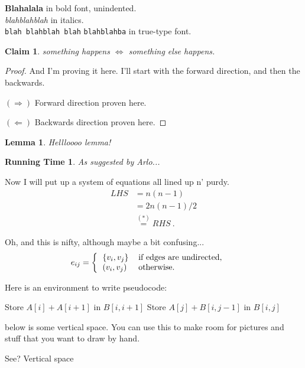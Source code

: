 \documentclass[11pt]{article}
\newtheorem{lemma}{Lemma}
\newtheorem*{claim}{Claim}
\newtheorem*{rt}{Running Time}
\begin{document}
\noindent \textbf{Blahalala} in bold font, unindented.\\
 
\noindent \emph{blahblahblah} in italics. \\

\noindent \verb+blah blahblah blah+ \texttt{blahblahba} in true-type font.\\ 

\begin{claim}
something happens $\iff$ something else happens.
\end{claim}

\begin{proof}And I'm proving it here. I'll start with the forward direction, and then the backwards.\medskip

\noindent $(\Rightarrow)$ Forward direction proven here.\medskip

\noindent $(\Leftarrow)$ Backwards direction proven here.\end{proof}

\begin{lemma}
Hellloooo lemma!
\end{lemma}

\begin{rt}
As suggested by Arlo...
\end{rt}

\newpage
\vspace*{2pt}

Now I will put up a system of equations all lined up n' purdy.
\begin{align*}
LHS &=  n(n-1) \\
&=  2n(n-1)/2 \\
& \stackrel{(*)}{=}  RHS~.
\end{align*}

Oh, and this is nifty, although maybe a bit confusing...
\begin{align*}
e_{ij} &=  \left\{ \begin{tabular}{ll} $\{v_i, v_j\}$ & if edges are undirected, \\
						       $(v_i, v_j)$ & otherwise. \end{tabular} \right.
\end{align*}

Here is an environment to write pseudocode:
\begin{algorithmic}
\STATE Store $A[i]+A[i+1]$ in $B[i,i+1]$ 
\STATE Store $A[j]+B[i,j-1]$ in $B[i,j]$
\ENDFOR
\ENDFOR
\end{algorithmic}

below is some vertical space. You can use this to make room for pictures and stuff that you want to draw by hand.

\vspace{4cm}

See? Vertical space


\end{document}
